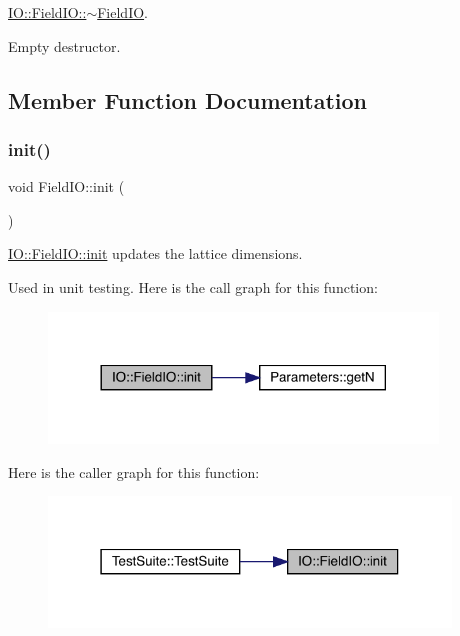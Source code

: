 \mbox{\hyperlink{class_i_o_1_1_field_i_o_ae11a6e9e9a57b6f0f56718b82774af19}{I\+O\+::\+Field\+I\+O\+::$\sim$\+Field\+IO}}. 

Empty destructor. 

\subsection{Member Function Documentation}
\mbox{\label{class_i_o_1_1_field_i_o_a9093930584128c73a63fe8015bff9b38}} 
\subsubsection{\texorpdfstring{init()}{init()}}
{\footnotesize\ttfamily void Field\+I\+O\+::init (\begin{DoxyParamCaption}{ }\end{DoxyParamCaption})\hspace{0.3cm}{\ttfamily [static]}}



\mbox{\hyperlink{class_i_o_1_1_field_i_o_a9093930584128c73a63fe8015bff9b38}{I\+O\+::\+Field\+I\+O\+::init}} updates the lattice dimensions. 

Used in unit testing. Here is the call graph for this function\+:
\nopagebreak
\begin{figure}[H]
\begin{center}
\leavevmode
\includegraphics[width=293pt]{class_i_o_1_1_field_i_o_a9093930584128c73a63fe8015bff9b38_cgraph}
\end{center}
\end{figure}
Here is the caller graph for this function\+:
\nopagebreak
\begin{figure}[H]
\begin{center}
\leavevmode
\includegraphics[width=303pt]{class_i_o_1_1_field_i_o_a9093930584128c73a63fe8015bff9b38_icgraph}
\end{center}
\end{figure}
\mbox{\label{class_i_o_1_1_field_i_o_af23fb6e02a6bd1cafd5be4acacbf848e}} 
